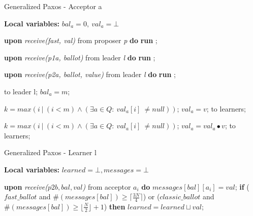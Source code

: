 \documentclass[runningheads,a4paper]{llncs}
\begin{document}
\begin{algorithm}
	\caption{Generalized Paxos - Acceptor a}
	\label{alg:acceptor}
	\textbf{Local variables: } $bal_a = 0,\ val_a = \bot$ 
	\begin{algorithmic}[1]
		
		\State \textbf{upon} \textit{receive(fast, val)} from proposer \textit{p} \textbf{do}
		\State \hspace{\algorithmicindent} \textbf{run} ;
		
		\State
		\State \textbf{upon} \textit{receive(p1a, ballot)} from leader \textit{l} \textbf{do}
		\State \hspace{\algorithmicindent} \textbf{run} ;
		
		\State
		\State \textbf{upon} \textit{receive(p2a, ballot, value)} from leader \textit{l} \textbf{do}
		\State \hspace{\algorithmicindent} \textbf{run} ;
		
		\State
		\State {} to leader l;
		\State $bal_a = m$;
		\EndIf
		\EndFunction
		
		\State
		\State $k = max(i\ |\ (i < m) \wedge (\exists a \in Q :\ val_a[i]\ \neq null))$;
		\State $val_a = v$;
		\State {} to learners;
		\EndIf
		\EndFunction
		
		\State
		\State $k = max(i\ |\ (i < m) \wedge (\exists a \in Q :\ val_a[i]\ \neq null))$;
		\State $val_a = val_a \bullet v$;
		\State {} to learners;
		\EndIf
		\EndFunction
		
	\end{algorithmic}
\end{algorithm}

\begin{algorithm}
	\caption{Generalized Paxos - Learner l}
	\label{alg:learner}
	\textbf{Local variables: } $learned = \bot, messages = \bot$ 
	\begin{algorithmic}[1]
		\State \textbf{upon} \textit{receive($p2b, bal, val$)} from acceptor $a_i$ \textbf{do}
		\State \hspace{\algorithmicindent} $messages[bal][a_i] = val$;
		\State \hspace{\algorithmicindent} \textbf{if} {($fast\_ballot$ and $\#(messages[bal]) \geq \lceil \frac{3N}{4} \rceil$) or
			\State \hspace{\algorithmicindent} \hspace{\algorithmicindent}	($classic\_ballot$ and $\#(messages[bal]) \geq \lfloor \frac{N}{2}\rfloor+1$)} \textbf{then}
		\State \hspace{\algorithmicindent} \hspace{\algorithmicindent} \hspace{\algorithmicindent} $learned = learned \sqcup val$;
	\end{algorithmic}
\end{algorithm}
\end{document}
